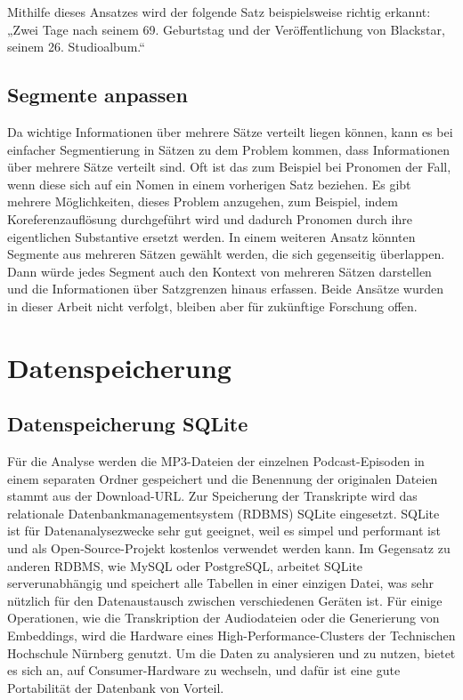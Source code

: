 Mithilfe dieses Ansatzes wird der folgende Satz beispielsweise richtig erkannt:
„Zwei Tage nach seinem 69. Geburtstag und der Veröffentlichung von Blackstar, seinem 26. Studioalbum.“


\subsection{Segmente anpassen}

Da wichtige Informationen über mehrere Sätze verteilt liegen können, kann es bei einfacher Segmentierung in Sätzen zu dem Problem kommen, dass Informationen über mehrere Sätze verteilt sind.
Oft ist das zum Beispiel bei Pronomen der Fall, wenn diese sich auf ein Nomen in einem vorherigen Satz beziehen.
Es gibt mehrere Möglichkeiten, dieses Problem anzugehen, zum Beispiel, indem Koreferenzauflösung durchgeführt wird und dadurch Pronomen durch ihre eigentlichen Substantive ersetzt werden.
In einem weiteren Ansatz könnten Segmente aus mehreren Sätzen gewählt werden, die sich gegenseitig überlappen.
Dann würde jedes Segment auch den Kontext von mehreren Sätzen darstellen und die Informationen über Satzgrenzen hinaus erfassen.
Beide Ansätze wurden in dieser Arbeit nicht verfolgt, bleiben aber für zukünftige Forschung offen.

\section{Datenspeicherung}

\subsection{Datenspeicherung SQLite}

Für die Analyse werden die MP3-Dateien der einzelnen Podcast-Episoden in einem separaten Ordner gespeichert und die Benennung der originalen Dateien stammt aus der Download-URL.
Zur Speicherung der Transkripte wird das relationale Datenbankmanagementsystem (RDBMS) SQLite eingesetzt. 
SQLite ist für Datenanalysezwecke sehr gut geeignet, weil es simpel und performant ist und als Open-Source-Projekt kostenlos verwendet werden kann.
Im Gegensatz zu anderen RDBMS, wie MySQL oder PostgreSQL, arbeitet SQLite serverunabhängig und speichert alle Tabellen in einer einzigen Datei, was sehr nützlich für den Datenaustausch zwischen verschiedenen Geräten ist.
Für einige Operationen, wie die Transkription der Audiodateien oder die Generierung von Embeddings, wird die Hardware eines High-Performance-Clusters der Technischen Hochschule Nürnberg genutzt.
Um die Daten zu analysieren und zu nutzen, bietet es sich an, auf Consumer-Hardware zu wechseln, und dafür ist eine gute Portabilität der Datenbank von Vorteil.

